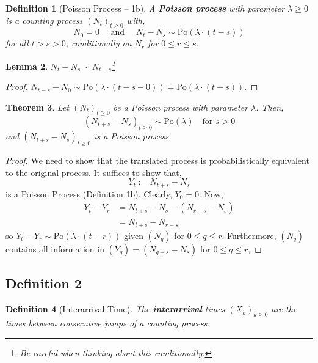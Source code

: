 \documentclass{tufte-handout}
\newtheorem{thm}{Theorem}
\newtheorem{lem}[thm]{Lemma}
\newtheorem{defn}[thm]{Definition}
\begin{document}
\begin{defn}[Poisson Process -- 1b]
  A \textbf{Poisson process} with parameter $\lambda \geq 0$ is a counting process $(N_t)_{t \geq 0}$ with,
  \[N_0 = 0 \quad \text{ and } \quad N_t - N_s \sim \text{Po}(\lambda \cdot (t-s))\]
  \noindent for all $t > s > 0$, conditionally on $N_r$ for $0 \leq r \leq s$.
  \label{maximalistprime}
\end{defn}

\begin{lem}
  $N_t - N_s \sim N_{t - s}$\footnote{Be careful when thinking about this conditionally.}
\end{lem}

\begin{proof}
  $N_{t - s} - N_0 \sim \text{Po}(\lambda \cdot (t - s - 0)) = \text{Po}(\lambda \cdot (t - s))$.
\end{proof}

\begin{thm}
  Let $(N_t)_{t \geq 0}$ be a Poisson process with parameter $\lambda$. Then,
  \[(N_{t+s} - N_s)_{t \geq 0} \sim \text{Po}(\lambda) \quad \text{for $s > 0$}\]
  \noindent and $(N_{t+s} - N_s)_{t \geq 0}$ is a Poisson process.
\end{thm}

\begin{proof}
  We need to show that the translated process is probabilistically equivalent to the original process. It suffices to show that, 
  \[Y_t := N_{t+s} - N_s\]
  \noindent is a Poisson Process (Definition 1b). Clearly, $Y_0 = 0$. Now,
  \begin{align*}
    Y_t - Y_r &= N_{t+s} - N_s - (N_{r+s} - N_s) \\
              &=N_{t+s} - N_{r+s}
  \end{align*}
  \noindent so $Y_t - Y_r \sim \text{Po}(\lambda \cdot (t - r))$ given $(N_q)$ for $0 \leq q \leq r$. Furthermore, $(N_q)$ contains all information in $(Y_q) = (N_{q + s} - N_s)$ for $ 0 \leq q \leq r$,
\end{proof}

\subsection{Definition 2}
\begin{defn}[Interarrival Time]
  The \textbf{interarrival} times $(X_k)_{k \geq 0}$ are the times between consecutive jumps of a counting process.
\end{defn}
\end{document}
